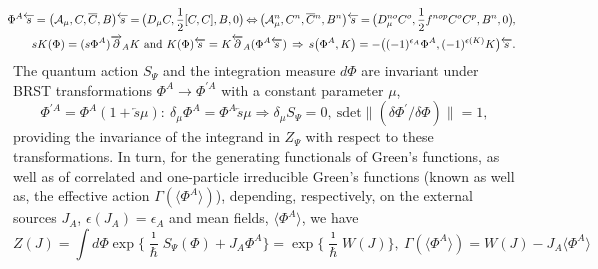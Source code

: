 \documentclass[10pt]{article}
\begin{document}
\begin{eqnarray}
 \hspace{-0.9em} &\hspace{-0.7em}& \Phi^A \overleftarrow{s}\hspace{-0.1em} = \big(\mathcal{A}_\mu, C, \overline{C}, B \big)\overleftarrow{s}\hspace{-0.1em} =\hspace{-0.1em}  \big(D_{\mu }C, \frac{1}{2}[C,C], B,0 \big) \hspace{-0.1em} \Leftrightarrow \hspace{-0.1em} \big(\mathcal{A}^n_\mu, C^n, \overline{C}{}^n, B^n \big)\overleftarrow{s}\hspace{-0.1em} = \hspace{-0.1em}\big(D_{\mu }^{no}C^o, \frac{1}{2}f^{nop}C^oC^p, B^n, 0 \big)\hspace{-0.1em}, \nonumber \\
\hspace{-0.9em} &\hspace{-0.7em}& sK(\Phi)  =   (s\Phi^A) \overrightarrow{\partial}_AK\  \mathrm{and} \  K(\Phi) \overleftarrow{s} =   K \overleftarrow{\partial}_A(\Phi^A \overleftarrow{s})    \, \Rightarrow  \,   s  \big(\Phi^A,K\big)= -\big( (-1)^{\epsilon_A}\Phi^A, (-1)^{\epsilon(K)}K\big) \overleftarrow{s}.\label{N1BRST}
\end{eqnarray}
The quantum action $S_\Psi$ and the integration measure $d \Phi$
are invariant  under BRST transformations $\Phi^A \to  \Phi^{\prime A}$
with a constant parameter $\mu$,
\begin{equation}\label{brstrans}
  \Phi^{\prime A} = \Phi^A(1+ \overleftarrow{s}\mu): \ \delta_{\mu}\Phi^A=\Phi^A \overleftarrow{s}\mu \Longrightarrow    \delta_{\mu}S_\Psi =0, \ \mathrm{sdet}\|\left( \delta\Phi^{\prime}/  \delta\Phi \right) \| =1,
\end{equation}
providing the invariance of the integrand in $Z_\Psi$ with respect to these transformations.
In turn, for the generating functionals of Green's functions, as well as of correlated
and one-particle irreducible Green's functions (known as well as,  the effective
action $\Gamma(\langle \Phi^A\rangle)$), depending, respectively, on the external sources
$J_A$,  $\epsilon(J_A)=\epsilon_A$ and mean fields, $\langle \Phi^A\rangle$, we have
 \begin{equation}\label{GFGF}
   Z(J)=\int  d \Phi   \exp \Big\{\frac{\imath}{\hbar}S_\Psi(\Phi)+J_A\Phi^A \Big\}= \exp \Big\{\frac{\imath}{\hbar}W(J)\Big\}, \  \Gamma(\langle \Phi^A\rangle) =  W(J) - J_A\langle \Phi^A\rangle
 \end{equation}
\end{document}
